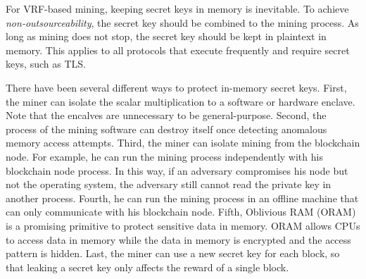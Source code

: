 For VRF-based mining, keeping secret keys in memory is inevitable.
To achieve \emph{non-outsourceability}, the secret key should be combined to the mining process.
As long as mining does not stop, the secret key should be kept in plaintext in memory.
This applies to all protocols that execute frequently and require secret keys, such as TLS.

There have been several different ways to protect in-memory secret keys.
First, the miner can isolate the scalar multiplication to a software or hardware enclave.
Note that the encalves are unnecessary to be general-purpose.
Second, the process of the mining software can destroy itself once detecting anomalous memory access attempts.
Third, the miner can isolate mining from the blockchain node.
For example, he can run the mining process independently with his blockchain node process.
In this way, if an adversary compromises his node but not the operating system, the adversary still cannot read the private key in another process.
Fourth, he can run the mining process in an offline machine that can only communicate with his blockchain node.
Fifth, Oblivious RAM (ORAM) is a promising primitive to protect sensitive data in memory.
ORAM allows CPUs to access data in memory while the data in memory is encrypted and the access pattern is hidden.
Last, the miner can use a new secret key for each block, so that leaking a secret key only affects the reward of a single block.
